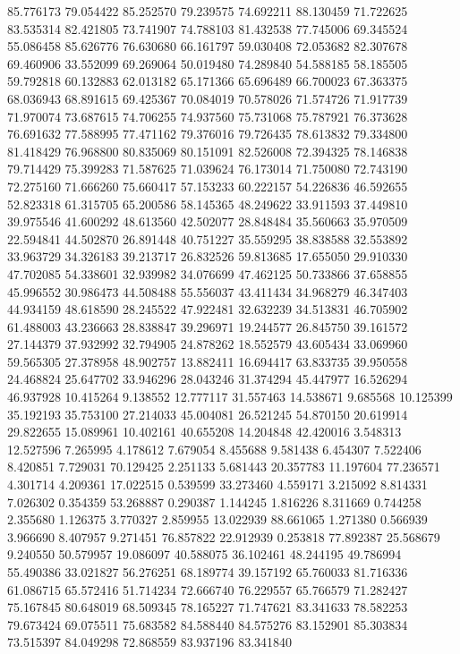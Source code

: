 85.776173
79.054422
85.252570
79.239575
74.692211
88.130459
71.722625
83.535314
82.421805
73.741907
74.788103
81.432538
77.745006
69.345524
55.086458
85.626776
76.630680
66.161797
59.030408
72.053682
82.307678
69.460906
33.552099
69.269064
50.019480
74.289840
54.588185
58.185505
59.792818
60.132883
62.013182
65.171366
65.696489
66.700023
67.363375
68.036943
68.891615
69.425367
70.084019
70.578026
71.574726
71.917739
71.970074
73.687615
74.706255
74.937560
75.731068
75.787921
76.373628
76.691632
77.588995
77.471162
79.376016
79.726435
78.613832
79.334800
81.418429
76.968800
80.835069
80.151091
82.526008
72.394325
78.146838
79.714429
75.399283
71.587625
71.039624
76.173014
71.750080
72.743190
72.275160
71.666260
75.660417
57.153233
60.222157
54.226836
46.592655
52.823318
61.315705
65.200586
58.145365
48.249622
33.911593
37.449810
39.975546
41.600292
48.613560
42.502077
28.848484
35.560663
35.970509
22.594841
44.502870
26.891448
40.751227
35.559295
38.838588
32.553892
33.963729
34.326183
39.213717
26.832526
59.813685
17.655050
29.910330
47.702085
54.338601
32.939982
34.076699
47.462125
50.733866
37.658855
45.996552
30.986473
44.508488
55.556037
43.411434
34.968279
46.347403
44.934159
48.618590
28.245522
47.922481
32.632239
34.513831
46.705902
61.488003
43.236663
28.838847
39.296971
19.244577
26.845750
39.161572
27.144379
37.932992
32.794905
24.878262
18.552579
43.605434
33.069960
59.565305
27.378958
48.902757
13.882411
16.694417
63.833735
39.950558
24.468824
25.647702
33.946296
28.043246
31.374294
45.447977
16.526294
46.937928
10.415264
9.138552
12.777117
31.557463
14.538671
9.685568
10.125399
35.192193
35.753100
27.214033
45.004081
26.521245
54.870150
20.619914
29.822655
15.089961
10.402161
40.655208
14.204848
42.420016
3.548313
12.527596
7.265995
4.178612
7.679054
8.455688
9.581438
6.454307
7.522406
8.420851
7.729031
70.129425
2.251133
5.681443
20.357783
11.197604
77.236571
4.301714
4.209361
17.022515
0.539599
33.273460
4.559171
3.215092
8.814331
7.026302
0.354359
53.268887
0.290387
1.144245
1.816226
8.311669
0.744258
2.355680
1.126375
3.770327
2.859955
13.022939
88.661065
1.271380
0.566939
3.966690
8.407957
9.271451
76.857822
22.912939
0.253818
77.892387
25.568679
9.240550
50.579957
19.086097
40.588075
36.102461
48.244195
49.786994
55.490386
33.021827
56.276251
68.189774
39.157192
65.760033
81.716336
61.086715
65.572416
51.714234
72.666740
76.229557
65.766579
71.282427
75.167845
80.648019
68.509345
78.165227
71.747621
83.341633
78.582253
79.673424
69.075511
75.683582
84.588440
84.575276
83.152901
85.303834
73.515397
84.049298
72.868559
83.937196
83.341840
